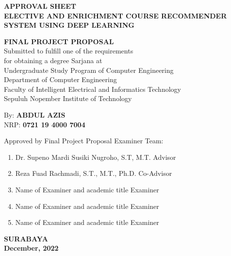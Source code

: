 {
\begin{center}
    \uppercase{\textbf{\large Approval Sheet}} \\

    \vspace*{10mm}
    \uppercase{\textbf{Elective and Enrichment Course Recommender System using Deep Learning}}
    \vspace*{10mm}

    {
        \uppercase{\textbf{Final Project Proposal}} \\
        Submitted to fulfill one of the requirements                  \\
        for obtaining a degree Sarjana at                             \\
        Undergraduate Study Program of Computer Engineering       \\
        Department of Computer Engineering                            \\
        Faculty of Intelligent Electrical and Informatics Technology  \\
        Sepuluh Nopember Institute of Technology                           \\
    }

    \vspace*{1.5cm}
    By: \textbf{\uppercase{Abdul Azis}}                                       \\
    NRP: \textbf{0721 19 4000 7004}                               \\
    \vspace*{1.5cm}

    Approved by Final Project Proposal Examiner Team:             \\
    \vspace*{5mm}

    \begin{enumerate}
        \setlength\itemsep{1.5em}
        \item Dr. Supeno Mardi Susiki Nugroho, S.T, M.T. \hfill Advisor
        \item Reza Fuad Rachmadi, S.T., M.T., Ph.D. \hfill Co-Advisor
        \item Name of Examiner and academic title \hfill Examiner
        \item Name of Examiner and academic title \hfill Examiner
        \item Name of Examiner and academic title \hfill Examiner
    \end{enumerate}

    \vspace*{1.5cm}
    \uppercase{\textbf{surabaya}}                      \\
    \textbf{December, 2022}                               \\

\end{center}
}